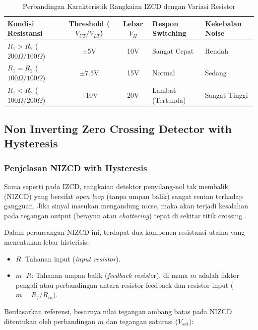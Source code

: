 \documentclass{article}
\begin{document}
\begin{table}[H]
\centering
\caption{Perbandingan Karakteristik Rangkaian IZCD dengan Variasi Resistor}
\label{tab:perbandingan_izcd}
\begin{tabular}{|l|c|c|l|l|}
\hline
\textbf{Kondisi Resistansi} & \textbf{Threshold} ($V_{UT}/V_{LT}$) & \textbf{Lebar} $V_H$ & \textbf{Respon Switching} & \textbf{Kekebalan Noise} \\ \hline
$R_1 > R_2$ ($200\Omega / 100\Omega$) & $\pm 5$V & 10V & Sangat Cepat & Rendah \\ \hline
$R_1 = R_2$ ($100\Omega / 100\Omega$) & $\pm 7.5$V & 15V & Normal & Sedang \\ \hline
$R_1 < R_2$ ($100\Omega / 200\Omega$) & $\pm 10$V & 20V & Lambat (Tertunda) & Sangat Tinggi \\ \hline
\end{tabular}
\end{table}

\subsection*{Non Inverting Zero Crossing Detector with Hysteresis}

\subsubsection*{Penjelasan NIZCD with Hysteresis}

Sama seperti pada IZCD, rangkaian detektor penyilang-nol tak membalik (NIZCD) yang bersifat \textit{open loop} (tanpa umpan balik) sangat rentan terhadap gangguan. Jika sinyal masukan mengandung noise, maka akan terjadi kesalahan pada tegangan output (berayun atau \textit{chattering}) tepat di sekitar titik crossing \cite{pujiono2012rangkaian}.

Dalam perancangan NIZCD ini, terdapat dua komponen resistansi utama yang menentukan lebar histerisis:

\begin{itemize}
    \item $R$: Tahanan input (\textit{input resistor}).
    \item $m \cdot R$: Tahanan umpan balik (\textit{feedback resisto}r), di mana $m$ adalah faktor pengali atau perbandingan antara resistor feedback dan resistor input ($m = R_f / R_{in}$).
\end{itemize}

Berdasarkan referensi, besarnya nilai tegangan ambang batas pada NIZCD ditentukan oleh perbandingan $m$ dan tegangan saturasi ($V_{sat}$):
\end{document}
